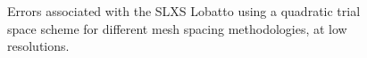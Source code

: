 \begin{figure}[!htp]
\begin{center}
{}
\end{center}
\caption{Errors associated with the SLXS Lobatto using a quadratic trial space scheme for different mesh spacing methodologies, at low resolutions.}
\label{fig:low_res_lobatto}
\end{figure}
%
%
